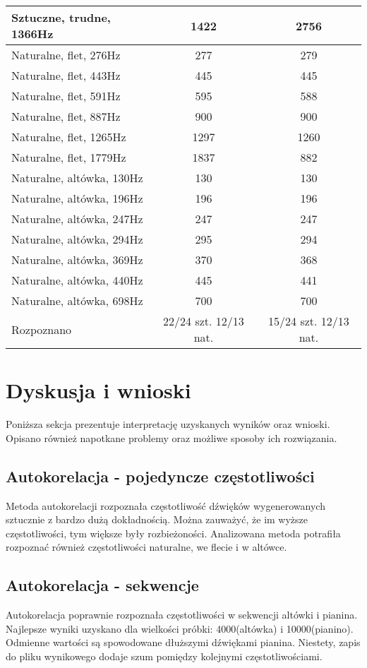 \documentclass{classrep}
\begin{document}
\begin{tabular}{ l | c | c }
  Sztuczne, trudne, 1366Hz & 1422 & 2756 \\
  \hline 
  Naturalne, flet, 276Hz & 277 & 279 \\
  Naturalne, flet, 443Hz & 445 & 445 \\
  Naturalne, flet, 591Hz & 595 & 588 \\
  Naturalne, flet, 887Hz & 900 & 900 \\
  Naturalne, flet, 1265Hz & 1297 & 1260 \\
  Naturalne, flet, 1779Hz & 1837 & 882 \\
  \hline 
  Naturalne, altówka, 130Hz & 130 & 130 \\
  Naturalne, altówka, 196Hz & 196 & 196 \\
  Naturalne, altówka, 247Hz & 247 & 247 \\
  Naturalne, altówka, 294Hz & 295 & 294 \\
  Naturalne, altówka, 369Hz & 370 & 368 \\
  Naturalne, altówka, 440Hz & 445 & 441 \\
  Naturalne, altówka, 698Hz & 700 & 700 \\
  \hline 
  Rozpoznano & 22/24 szt. 12/13 nat. & 15/24 szt. 12/13 nat. \\
  \hline 
\end{tabular}

\section{Dyskusja i wnioski}
Poniższa sekcja prezentuje interpretację uzyskanych wyników oraz wnioski. Opisano również napotkane problemy oraz możliwe sposoby ich rozwiązania.

\subsection{Autokorelacja - pojedyncze częstotliwości}
Metoda autokorelacji rozpoznała częstotliwość dźwięków wygenerowanych sztucznie z bardzo dużą dokładnością. Można zauważyć, że im wyższe częstotliwości, tym większe były rozbieżoności. Analizowana metoda potrafiła rozpoznać również częstotliwości naturalne, we flecie i w altówce.

\subsection{Autokorelacja - sekwencje}
Autokorelacja poprawnie rozpoznała częstotliwości w sekwencji altówki i pianina. Najlepsze wyniki uzyskano dla wielkości próbki: 4000(altówka) i 10000(pianino). Odmienne wartości są spowodowane dłuższymi dźwiękami pianina. Niestety, zapis do pliku wynikowego dodaje szum pomiędzy kolejnymi częstotliwościami.
\end{document}
